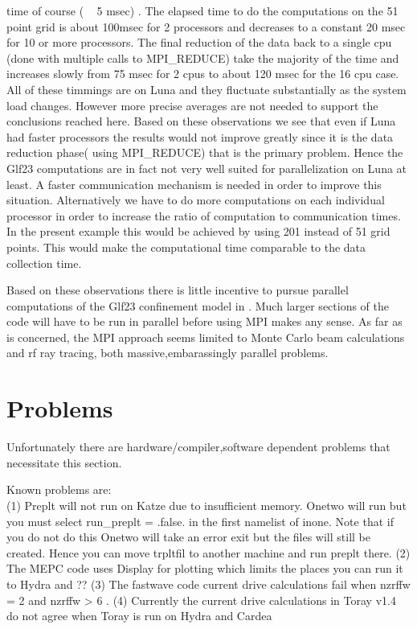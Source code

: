 \documentclass[12pt]{article}
\begin{document}
 time of course ( ~ 5 msec) . The elapsed time to do the computations
 on the 51 point grid is about 100msec for 2 processors and decreases
 to a constant 20 msec for 10 or more processors. The final reduction
 of the data back to a single cpu (done  with multiple calls to
 MPI\_REDUCE) take the majority of the time and increases slowly from
 75 msec for 2 cpus to about 120 msec for the 16 cpu case. All of
 these timmings are on Luna and they fluctuate substantially as the
 system load  changes. However more precise averages are not needed to
 support the conclusions reached here. 
  Based on these observations we see that even if  Luna had faster
  processors the results would not improve greatly since it is the 
  data reduction phase( using MPI\_REDUCE)  that is the primary
  problem. Hence the Glf23
  computations are in fact not very well suited for parallelization
  on Luna at least. A faster communication mechanism is needed in
  order to improve this situation. 
  Alternatively we have to do more
 computations on each individual processor in order to increase the
 ratio  of computation to communication times. In the present
 example this would   be achieved by using 201 instead of 51 grid
 points. This would make the computational time comparable to the data
 collection time. 

      Based on these observations there is little incentive to pursue
 parallel computations of the Glf23 confinement model in \ot. Much
 larger sections of the code will have to be run in parallel before
 using MPI makes any sense. As far as \ot is concerned, the MPI
 approach  seems limited to
 Monte Carlo beam calculations and rf ray tracing, both massive,embarassingly
 parallel problems.   

     \section{Problems}
     Unfortunately there are hardware/compiler,software dependent problems that
     necessitate this section.
     
     Known problems are: \\
     (1) Preplt will not run on Katze due to insufficient memory.
         Onetwo will run  but you must select run\_preplt = .false.
         in the first namelist of inone. Note that if you do not do
         this Onetwo will take an error exit but the files will still
         be created. Hence you can move trpltfil to another machine
         and run preplt there.
     (2) The MEPC code uses Display for plotting which limits the
         places you can run it to Hydra and ??
     (3) The fastwave code current drive calculations fail when 
         nzrffw = 2 and nzrffw > 6 .
     (4) Currently the current drive calculations in Toray v1.4 do
         not agree when Toray is run on Hydra and Cardea
    
\end{document}
